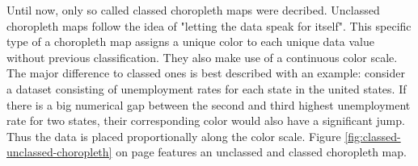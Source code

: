 Until now, only so called classed choropleth maps were decribed. Unclassed choropleth maps follow the idea of "letting the data speak for itself". This specific type of a choropleth map assigns a unique color to each unique data value without previous classification. They also make use of a continuous color scale. The major difference to classed ones is best described with an example: consider a dataset consisting of unemployment rates for each state in the united states. If there is a big numerical gap between the second and third highest unemployment rate for two states, their corresponding color would also have a significant jump. Thus the data is placed proportionally along the color scale. Figure \ref{fig:classed-unclassed-choropleth} on page \pageref{fig:classed-unclassed-choropleth} features an unclassed and classed choropleth map.

